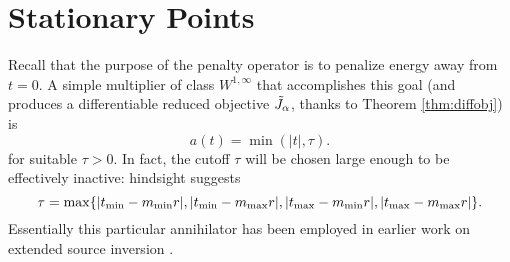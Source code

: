 \section{Stationary Points}

Recall that the purpose of the penalty operator is to penalize energy away from 
$t=0$. A simple multiplier of class $W^{1,\infty}$ that accomplishes
this goal (and produces a differentiable reduced objective $\tilde{J}_{\alpha}$,
thanks to Theorem \ref{thm:diffobj}) is
\begin{equation}
  \label{eqn:ann}
  a(t) = \min(|t|, \tau). 
\end{equation}
for suitable $\tau>0$. In fact, 
the cutoff $\tau$ will be chosen large enough to be effectively inactive: 
hindsight suggests 
\begin{equation}
  \label{eqn:taudef}
  \tau = \max\{|t_{\rm min}-m_{\rm min}r|,|t_{\rm min}-m_{\rm max}r|, |t_{\rm max}-m_{\rm min}r|, |t_{\rm max}-m_{\rm max}r|\}. 
\end{equation}
Essentially this 
particular annihilator has been employed in earlier work on extended 
source inversion 
\cite[]{Plessix:00a,LuoSava:11,Warner:14,HuangSymes:SEG15a,Warner:16,HuangSymes:Geo17}.

